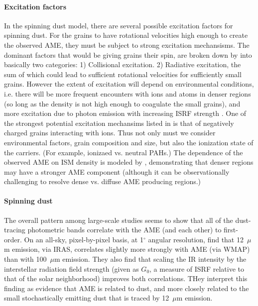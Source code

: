      \paragraph{Excitation factors}
       In the spinning dust model, there are several possible excitation factors for spinning dust. For the grains to have rotational velocities high enough to create the observed AME, they must be subject to strong excitation mechansisms. The dominant factors that would be giving grains their spin, are broken down by \cite{draine11} into basically two categories: 1) Collisional excitation. 2) Radiative excitation, the sum of which could lead to sufficient rotational velocities for sufficiently small grains. However the extent of excitation will depend on environmental conditions, i.e. there will be more frequent encounters with ions and atoms in denser regions (so long as the density is not high enough to coagulate the small grains), and more excitation due to photon emission with increasing ISRF strength \citep{ali-haimoud09, ali-haimoud14}. One of the strongest potential excitation mechansims listed in \cite{draine11} is that of negatively charged grains interacting with ions. Thus not only must we consider environmental factors, grain composition and size, but also the ionization state of the carriers. (For example, ionizaed vs. neutral PAHs.) The dependence of the observed AME on ISM density is modeled by \cite{ali-haimoud10}, demonstrating that denser regions may have a stronger AME component (although it can be observationally challenging to resolve dense vs. diffuse AME producing regions.)

       \paragraph{Spinning dust}
        The overall pattern among large-scale studies seems to show that all of the dust-tracing photometric bands correlate with the AME (and each other) to first-order.  On an all-sky, pixel-by-pixel basis, at 1$^{\circ}$ angular resolution, \cite{ysard10b} find that 12~$\mu$m emission, via IRAS, correlates slightly more strongly with AME (via WMAP) than with 100~$\mu$m emission.  They also find that scaling the IR intensity by the interstellar radiation field strength (given as $G_0$, a measure of ISRF relative to that of the solar neighborhood) improves both correlations. THey interpret this finding as evidence that AME is related to dust, and more closely related to the small stochastically emitting dust that is traced by 12~$\mu$m emission.

